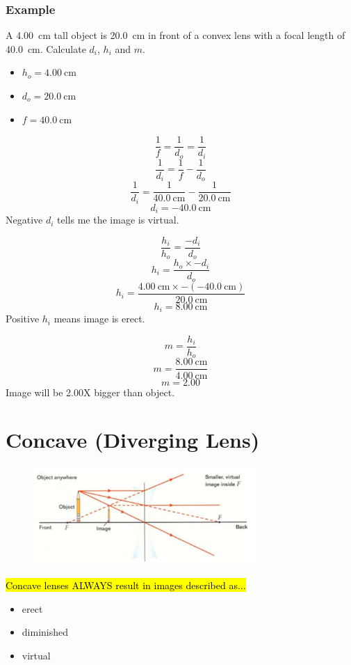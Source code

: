 \documentclass[a4paper,12pt]{article}
\begin{document}
\subsubsection{Example}
A \SI{4.00}{\cm} tall object is \SI{20.0}{\cm} in front of a convex lens with a focal length of \SI{40.0}{\cm}. Calculate $d_i$, $h_i$ and $m$.
\begin{itemize}
    \item{$h_o = \SI{4.00}{\cm}$}
    \item{$d_o = \SI{20.0}{\cm}$}
    \item{$f = \SI{40.0}{\cm}$}
\end{itemize}
$$\frac{1}{f} = \frac{1}{d_o} = \frac{1}{d_i}$$
$$\frac{1}{d_i} = \frac{1}{f} - \frac{1}{d_o}$$
$$\frac{1}{d_i} = \frac{1}{\SI{40.0}{\cm}} - \frac{1}{\SI{20.0}{\cm}}$$
$$d_i = \SI{-40.0}{\cm}$$
Negative $d_i$ tells me the image is virtual.

$$\frac{h_i}{h_o} = \frac{-d_i}{d_o}$$
$$h_i = \frac{h_o \times -d_i}{d_o}$$
$$h_i = \frac{\SI{4.00}{\cm} \times -(\SI{-40.0}{\cm})}{\SI{20.0}{\cm}}$$
$$h_i = \SI{8.00}{\cm}$$
Positive $h_i$ means image is erect.

$$m = \frac{h_i}{h_o}$$
$$m = \frac{\SI{8.00}{\cm}}{\SI{4.00}{\cm}}$$
$$m = \num{2.00}$$
Image will be 2.00X bigger than object.

\pagebreak
\section{Concave (Diverging Lens)}
\begin{figure}[H]
    \centering
    \includegraphics[width=0.75\textwidth]{concave}
\end{figure}

\hl{Concave lenses ALWAYS result in images described as...}
\begin{itemize}
    \item{erect}
    \item{diminished}
    \item{virtual}
\end{itemize}
\end{document}
